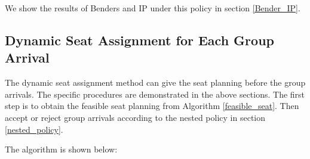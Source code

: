 

We show the results of Benders and IP under this policy in section \ref{Bender_IP}.


\subsection{Dynamic Seat Assignment for Each Group Arrival}
The dynamic seat assignment method can give the seat planning before the group arrivals. The specific procedures are demonstrated in the above sections. The first step is to obtain the feasible seat planning from Algorithm \ref{feasible_seat}. Then accept or reject group arrivals according to the nested policy in section \ref{nested_policy}.

The algorithm is shown below:

